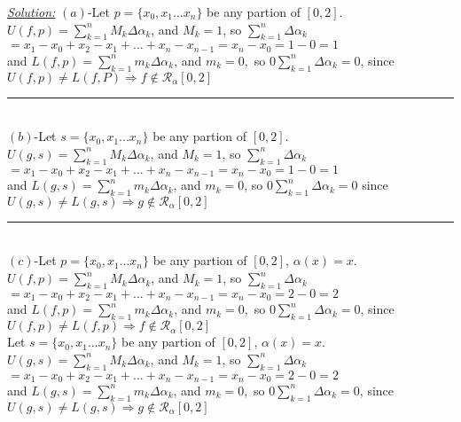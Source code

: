 \documentclass{article}
\begin{document}
\begin{tcolorbox}[enhanced,attach boxed title to top center={yshift=-3mm,yshifttext=-1mm},
  colback=blue!5!white,colframe=blue!75!black,colbacktitle=red!80!black,
  title=Exercise 12:.,fonttitle=\bfseries,
  boxed title style={size=small,colframe=red!50!black} ]
  \textit{\underline {\color{blue}Solution:}}
$(a)$-Let $p=\{x_0,x_1...x_n\}$ be any partion of $[0,2]$.\\
$U(f,p)=\sum_{k=1}^n M_k\Delta\alpha_k$, and $M_k=1$, so $\sum_{k=1}^n\Delta\alpha_k$\\
    $=x_1-x_0+x_2-x_1+...+x_n-x_{n-1}=x_n-x_0=1-0=1$\\
    and 
    $L(f,p)=\sum_{k=1}^n m_k\Delta\alpha_k$, and $m_k=0$,\ so
    $0\sum_{k=1}^n\Delta\alpha_k=0$, since $U(f,p)\neq L(f,P)\Rightarrow f\notin\mathscr{R}_\alpha[0,2]$
    \\
  \noindent\rule{8cm}{0.4pt}\\
    $(b)$-Let $s=\{x_0,x_1...x_n\}$ be any partion of $[0,2]$.\\
    $U(g,s)=\sum_{k=1}^n M_k\Delta\alpha_k$, and $M_k=1$, so $\sum_{k=1}^n\Delta\alpha_k$\\
    $=x_1-x_0+x_2-x_1+...+x_n-x_{n-1}=x_n-x_0=1-0=1$\\
    and $L(g,s)=\sum_{k=1}^n m_k\Delta\alpha_k$, and $m_k=0$, so
    $0\sum_{k=1}^n\Delta\alpha_k=0$
    since $U(g,s)\neq L(g,s)\Rightarrow g\notin\mathscr{R}_\alpha[0,2]$\\
     \noindent\rule{8cm}{0.4pt}\\
$(c)$-Let $p=\{x_0,x_1...x_n\}$ be any partion of $[0,2]$, $\alpha(x)=x$.\\
$U(f,p)=\sum_{k=1}^n M_k\Delta\alpha_k$, and $M_k=1$, so $\sum_{k=1}^n\Delta\alpha_k$\\
    $=x_1-x_0+x_2-x_1+...+x_n-x_{n-1}=x_n-x_0=2-0=2$\\
    and $L(f,p)=\sum_{k=1}^n m_k\Delta\alpha_k$, and $m_k=0$,\ so
    $0\sum_{k=1}^n\Delta\alpha_k=0$, since $U(f,p)\neq L(f,p)\Rightarrow f\notin\mathscr{R}_\alpha[0,2]$\\
    
    Let $s=\{x_0,x_1...x_n\}$ be any partion of $[0,2]$, $\alpha(x)=x$.\\
$U(g,s)=\sum_{k=1}^n M_k\Delta\alpha_k$, and $M_k=1$, so $\sum_{k=1}^n\Delta\alpha_k$\\
    $=x_1-x_0+x_2-x_1+...+x_n-x_{n-1}=x_n-x_0=2-0=2$\\
    and $L(g,s)=\sum_{k=1}^n m_k\Delta\alpha_k$, and $m_k=0$,\ so
    $0\sum_{k=1}^n\Delta\alpha_k=0$, since $U(g,s)\neq L(g,s)\Rightarrow g\notin\mathscr{R}_\alpha[0,2]$\\
    
\end{tcolorbox}
\end{document}
